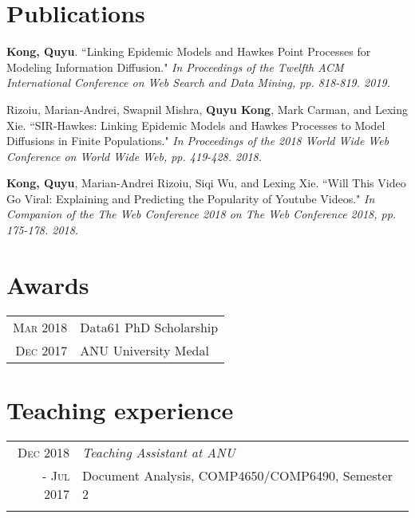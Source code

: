 \documentclass[a4paper,10pt]{article}
\newcommand{\tabitem}{~~\llap{\textbullet}~~}
\begin{document}


\section{Publications}
\begin{enumerate}[label={[\arabic*]}]
    \item \textbf{Kong, Quyu}. ``Linking Epidemic Models and Hawkes Point Processes for Modeling Information Diffusion." \textit{In Proceedings of the Twelfth ACM International Conference on Web Search and Data Mining, pp. 818-819. 2019.}
    \item Rizoiu, Marian-Andrei, Swapnil Mishra, \textbf{Quyu Kong}, Mark Carman, and Lexing Xie. ``SIR-Hawkes: Linking Epidemic Models and Hawkes Processes to Model Diffusions in Finite Populations." \textit{In Proceedings of the 2018 World Wide Web Conference on World Wide Web, pp. 419-428. 2018.}
    \item \textbf{Kong, Quyu}, Marian-Andrei Rizoiu, Siqi Wu, and Lexing Xie. ``Will This Video Go Viral: Explaining and Predicting the Popularity of Youtube Videos." \textit{In Companion of the The Web Conference 2018 on The Web Conference 2018, pp. 175-178. 2018.}
\end{enumerate}

\section{Awards}
\begin{tabular}{rl}
\textsc{Mar 2018} & Data61 PhD Scholarship \\
\textsc{Dec 2017} & ANU University Medal \\
\end{tabular}

\section{Teaching experience}
\begin{tabular}{r|p{11cm}}
 
  \textsc{Dec 2018} & \textit{Teaching Assistant at ANU} \\\textsc{- Jul 2017}&\footnotesize{Document Analysis, COMP4650/COMP6490, Semester 2}\\\multicolumn{2}{c}{}
\end{tabular}
\end{document}
